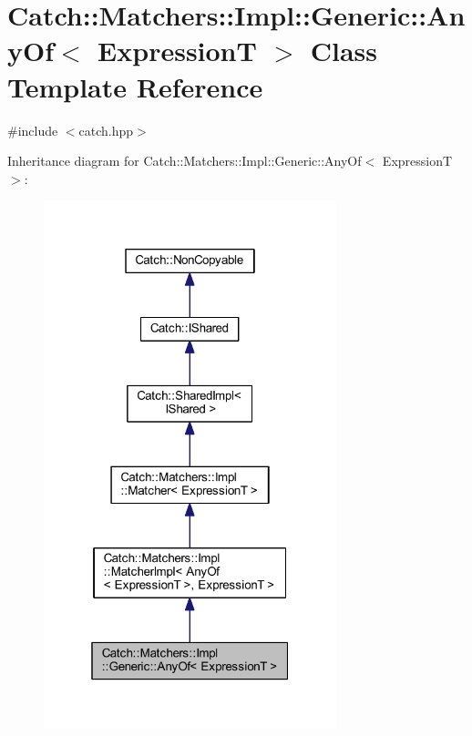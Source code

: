 \hypertarget{class_catch_1_1_matchers_1_1_impl_1_1_generic_1_1_any_of}{}\section{Catch\+:\+:Matchers\+:\+:Impl\+:\+:Generic\+:\+:Any\+Of$<$ ExpressionT $>$ Class Template Reference}
\label{class_catch_1_1_matchers_1_1_impl_1_1_generic_1_1_any_of}


{\ttfamily \#include $<$catch.\+hpp$>$}



Inheritance diagram for Catch\+:\+:Matchers\+:\+:Impl\+:\+:Generic\+:\+:Any\+Of$<$ ExpressionT $>$\+:\nopagebreak
\begin{figure}[H]
\begin{center}
\leavevmode
\includegraphics[width=241pt]{class_catch_1_1_matchers_1_1_impl_1_1_generic_1_1_any_of__inherit__graph}
\end{center}
\end{figure}


